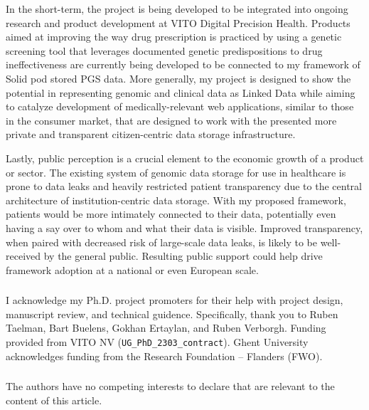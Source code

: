 \documentclass[runningheads]{llncs}
\begin{document}
In the short-term, the project is being developed to be integrated into ongoing research and product development at VITO Digital Precision Health. 
Products aimed at improving the way drug prescription is practiced by using a genetic screening tool that leverages documented genetic predispositions to drug ineffectiveness are currently being developed to be connected to my framework of Solid pod stored PGS data. 
More generally, my project is designed to show the potential in representing genomic and clinical data as Linked Data while aiming to catalyze  development of medically-relevant web applications, similar to those in the consumer market, that are designed to work with the presented more private and transparent citizen-centric data storage infrastructure.

Lastly, public perception is a crucial element to the economic growth of a product or sector. 
The existing system of genomic data storage for use in healthcare is prone to data leaks and heavily restricted patient transparency due to the central architecture of institution-centric data storage. 
With my proposed framework, patients would be more intimately connected to their data, potentially even having a say over to whom and what their data is visible. 
Improved transparency, when paired with decreased risk of large-scale data leaks, is likely to be well-received by the general public. 
Resulting public support could help drive framework adoption at a national or even European scale. 


\begin{credits}
\subsubsection{\ackname} 
I acknowledge my Ph.D. project promoters for their help with project design, manuscript review, and technical guidence.
Specifically, thank you to Ruben Taelman, Bart Buelens, Gokhan Ertaylan, and Ruben Verborgh.
Funding provided from VITO NV (\verb|UG_PhD_2303_contract|). 
Ghent University acknowledges funding from the Research Foundation – Flanders (FWO).
\subsubsection{\discintname} The authors have no competing interests to declare that are relevant to the content of this article.
\end{credits}



\end{document}
